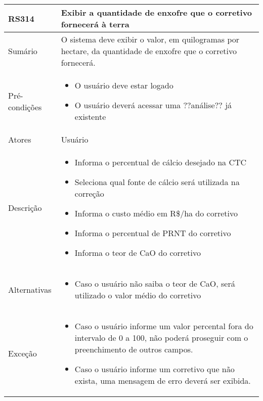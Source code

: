 \begin{quadro}[H]
    \begin{tabular}{|p{3cm}|p{11cm}|}
        \hline
        \textbf{RS314} & \textbf{Exibir a quantidade de enxofre que o corretivo fornecerá à terra}                                      \\
        \hline
        Sumário        & O sistema deve exibir o valor, em quilogramas por hectare, da quantidade de enxofre que o corretivo fornecerá. \\
        \hline
        Pré-condições  & \begin{itemize}
            \item O usuário deve estar logado
            \item O usuário deverá acessar uma ??análise?? já existente
        \end{itemize}                                                                                     \\
        \hline
        Atores         & Usuário                                                                                                        \\
        \hline
        Descrição      &
        \begin{itemize}
            \item Informa o percentual de cálcio desejado na CTC
            \item Seleciona qual fonte de cálcio será utilizada na correção
            \item Informa o custo médio em R\$/ha do corretivo
            \item Informa o percentual de PRNT do corretivo
            \item Informa o teor de CaO do corretivo
        \end{itemize}                                                                                                      \\
        \hline
        Alternativas   &
        \begin{itemize}
            \item Caso o usuário não saiba o teor de CaO, será utilizado o valor médio do corretivo
        \end{itemize}                                                                                                      \\
        \hline
        Exceção        &
        \begin{itemize}
            \item Caso o usuário informe um valor percental fora do intervalo de 0 a 100, não poderá proseguir com o preenchimento de outros campos.
            \item Caso o usuário informe um corretivo que não exista, uma mensagem de erro deverá ser exibida.
        \end{itemize}                                                                                                      \\
        \hline
    \end{tabular}
\end{quadro}

